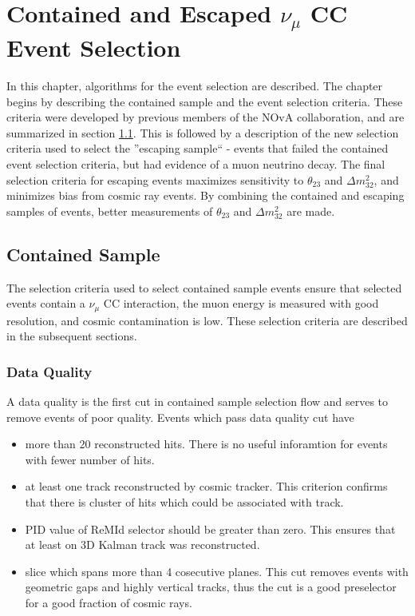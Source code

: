 \chapter{Contained and Escaped $\nu_\mu$ CC Event Selection}
\label{event_selection_chapter}

In this chapter, algorithms for the event selection are
described. The chapter begins by describing the contained sample and the event selection
criteria. These criteria were developed by previous members of the NOvA collaboration,
and are summarized in section \ref{cont_sec}.  This is followed by a description of
the new selection criteria used to select the ''escaping sample`` - events that failed
the contained event selection criteria, but had evidence of a muon neutrino decay. The
final selection criteria for escaping events maximizes sensitivity to
$\theta_{23}$ and $\Delta m_{32}^2$, and minimizes bias from cosmic ray events.  By
combining the contained and escaping samples of events, better measurements of $\theta_{23}$
and $\Delta m_{32}^2$ are made.

\section{Contained Sample} \label{cont_sec}
The selection criteria used to select contained sample events ensure that selected events
contain a $\nu_\mu$ CC interaction, the muon energy is measured with good resolution,
and cosmic contamination is low.  These selection criteria are described in the subsequent
sections.

\subsection{Data Quality}
A data quality is the first cut in contained sample selection flow and serves to remove 
events of poor quality. Events which pass data quality cut have
\begin{itemize}
\item more than 20 reconstructed hits. There is no useful inforamtion for events with fewer 
number of hits.
\item at least one track reconstructed by cosmic tracker. This criterion confirms that there is
cluster of hits which could be associated with track.
\item PID value of ReMId selector should be greater than zero. This ensures that at least on 
3D Kalman track was reconstructed.
\item slice which spans more than 4 cosecutive planes. This cut removes events with geometric 
gaps and highly vertical tracks, thus the cut is a good preselector for a good fraction of 
cosmic rays.
\end{itemize}

